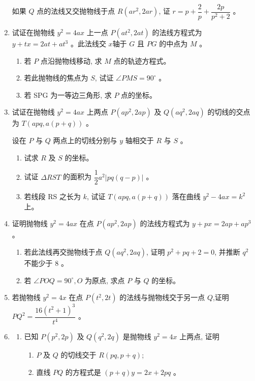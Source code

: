 \documentclass[10pt]{article}
\begin{document}
\begin{enumerate}
  如果 $Q$ 点的法线又交抛物线于点 $R\left(a r^{2}, 2 a r\right)$, 证 $r=p+\dfrac{2}{p}+\dfrac{2 p}{p^{2}+2}$ 。

  \item 试证在抛物线 $y^{2}=4 a x$ 上一点 $P\left(a t^{2}, 2 a t\right)$ 的法线方程式为 $y+t x=2 a t+a t^{3}$ 。此法线交 $x$轴于 $G$ 且 $P G$ 的中点为 $M$ 。
  \begin{enumerate}
    \item 若 $P$ 点沿抛物线移动, 求 $M$ 点的轨迹方程式。
    \item 若此抛物线的焦点为 $S$, 试证 $\angle PMS=90^{\circ}$ 。
    \item 若 SPG 为一等边三角形, 求 $P$ 点的坐标。
  \end{enumerate}

  \item 试证在抛物线 $y^{2}=4 a x$ 上两点 $P\left(a p^{2}, 2 a p\right)$ 及 $Q\left(a q^{2}, 2 a q\right)$ 的切线的交点为 $T(a p q, a(p+q))$ 。

  设在 $P$ 与 $Q$ 两点上的切线分别与 $y$ 轴相交于 $R$ 与 $S$ 。
  \begin{enumerate}
    \item 试求 $R$ 及 $S$ 的坐标。
    \item 试证 $\Delta RST$ 的面积为 $\dfrac{1}{2} a^{2}|p q(q-p)|$ 。
    \item 若线段 RS 之长为 $k$, 试证 $T(a p q, a(p+q))$ 落在曲线 $y^{2}-4 a x=k^{2}$ 上。
  \end{enumerate}

  \item 证明抛物线 $y^{2}=4 a x$ 在点 $P\left(a p^{2}, 2 a p\right)$ 的法线方程式为 $y+p x=2 a p+a p^{3}$ 。
  \begin{enumerate}
    \item 若此法线再交抛物线于点 $Q\left(a q^{2}, 2 a q\right)$, 证明 $p^{2}+p q+2=0$, 并推断 $q^{2}$ 不能少于 8 。
    \item 若 $\angle POQ=90^{\circ}, O$ 为原点, 求点 $P$ 与 $Q$ 的坐标。
  \end{enumerate}

  \item 若抛物线 $y^{2}=4 x$ 在点 $P\left(t^{2}, 2 t\right)$ 的法线与抛物线交于另一点 $Q$,证明 $P Q^{2}=\dfrac{16\left(t^{2}+1\right)^{3}}{t^{4}}$ 。

  \item \begin{enumerate}
    \item 已知 $P\left(p^{2}, 2 p\right)$ 及 $Q\left(q^{2}, 2 q\right)$ 是抛物线 $y^{2}=4 x$ 上两点, 证明
    \begin{enumerate}
      \item $P$ 及 $Q$ 的切线交于 $R(p q, p+q)$;
      \item 直线 $PQ$ 的方程式是 $(p+q) y=2 x+2 p q$ 。
    \end{enumerate}
  

\end{enumerate}
\end{enumerate}
\end{document}
